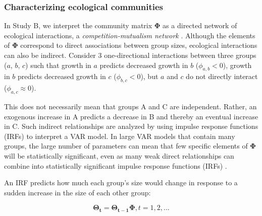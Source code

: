 \documentclass[letterpaper]{article}\usepackage[]{graphicx}\usepackage[]{color}
\begin{document}

\subsubsection{Characterizing ecological communities}
\label{sec:characterizing.ecological.communities}

In Study B, we interpret the community matrix $\mathbf{\Phi}$ as a directed network of ecological interactions, a \emph{competition-mutualism network} \citep{ives_estimating_2003}. Although the elements of $\mathbf{\Phi}$ correspond to direct associations between group sizes, ecological interactions can also be indirect. Consider 3 one-directional interactions between three groups ($a$, $b$, $c$) such that growth in $a$ predicts decreased growth in $b$ ($\phi_{a,b} < 0$), growth in $b$ predicts decreased growth in $c$ ($\phi_{b,c} < 0$), but $a$ and $c$ do not directly interact ($\phi_{a,c} \approx 0$).


This does not necessarily mean that groups A and C are independent. Rather, an exogenous increase in A predicts a decrease in B and thereby an eventual increase in C.  Such indirect relationships are analyzed by using impulse response functions (IRFs) to interpret a VAR model. %
In large VAR models that contain many groups, the large number of parameters can mean that few specific elements of $\mathbf{\Phi}$ will be statistically significant, even as many weak direct relationships can combine into statistically significant impulse response functions (IRFs) \cite{ives_estimating_2003}. 

An IRF predicts how much each group's size would change in response to a sudden increase in the size of each other group: %

\begin{equation}
    \mathbf{\Theta_t} = \mathbf{\Theta_{t-1}}\mathbf{\Phi}, t = 1,2,... \label{eq:irf} 
\end{equation}
\end{document}
